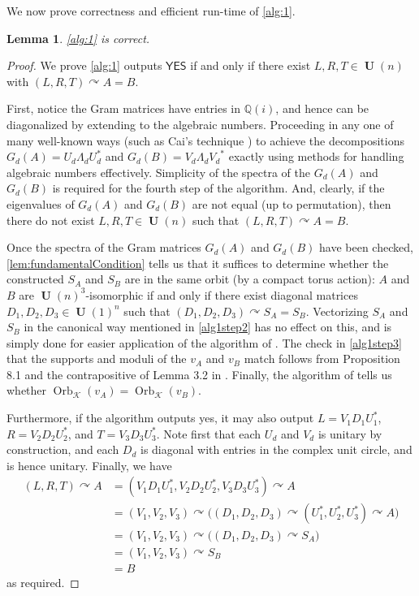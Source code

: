 \documentclass[11pt]{article}
\numberwithin{equation}{section}
\newtheorem{lemma}[theorem]{Lemma}
\theoremstyle{remark}
\DeclareMathOperator{\Orb}{Orb}
\DeclareMathOperator{\Unitary}{\textbf{U}}
\newcommand{\QQ}{\mathbb{Q}}
\newcommand{\cK}{\mathcal{K}}
\begin{document}
We now prove correctness and efficient run-time of \cref{alg:1}.

\begin{lemma}\label{lem:algoCorrect}
    \cref{alg:1} is correct.
\end{lemma}
\begin{proof}
We prove \cref{alg:1} outputs $\textsf{YES}$ if and only if there exist $L, R, T \in \Unitary(n)$ with $(L, R, T) \curvearrowright A = B$.

First, notice the Gram matrices have entries in $\QQ(i)$, and hence can be diagonalized by extending to the algebraic numbers. Proceeding in any one of many well-known ways (such as Cai's technique \cite{cai1994computing}) to achieve the decompositions $G_d(A) = U_d \Lambda_d U_d^*$ and $G_d(B)=V_d\Lambda_d {V_d}^*$ exactly using methods for handling algebraic numbers effectively.
Simplicity of the spectra of the $G_d(A)$ and $G_d(B)$ is required for the fourth step of the algorithm. And, clearly, if the eigenvalues of $G_d(A)$ and $G_d(B)$ are not equal (up to permutation), then there do not exist $L, R, T \in \Unitary(n)$ such that $(L, R, T) \curvearrowright A = B$.

Once the spectra of the Gram matrices $G_d(A)$ and $G_d(B)$ have been checked, \cref{lem:fundamentalCondition} tells us that it suffices to determine whether the constructed $S_A$ and $S_B$ are in the same orbit (by a compact torus action): $A$ and $B$ are $\Unitary(n)^3$-isomorphic if and only if there exist diagonal matrices $D_1,D_2,D_3 \in \Unitary(1)^n$ such that $(D_1,D_2,D_3)\curvearrowright S_A = S_B$. Vectorizing $S_A$ and $S_B$ in the canonical way mentioned in \ref{alg1step2} has no effect on this, and is simply done for easier application of the algorithm of \cite{burgisser_et_alCCC.2021.32}.
The check in \ref{alg1step3} that the supports and moduli of the $v_A$ and $v_B$ match follows from Proposition 8.1 and the contrapositive of Lemma 3.2 in \cite{burgisser_et_alCCC.2021.32}.
Finally, the algorithm of \cite{burgisser_et_alCCC.2021.32} tells us whether $\Orb_\cK(v_A) = \Orb_\cK(v_B)$.

Furthermore, if the algorithm outputs yes, it may also output $L= V_1D_1U_1^*$, $R = V_2D_2U_2^*$, and $T = V_3D_3U_3^*$. Note first that each $U_d$ and $V_d$ is unitary by construction, and each $D_d$ is diagonal with entries in the complex unit circle, and is hence unitary. Finally, we have
\begin{align*}
(L,R,T)\curvearrowright A
&=(V_1D_1U_1^*,V_2D_2U_2^*,V_3D_3U_3^*) \curvearrowright A\\
&=(V_1,V_2,V_3)\curvearrowright \big((D_1,D_2,D_3)\curvearrowright (U_1^*,U_2^*,U_3^*)\curvearrowright A\big)\\
&=(V_1,V_2,V_3)\curvearrowright \big((D_1,D_2,D_3)\curvearrowright S_A\big)\\
&=(V_1,V_2,V_3)\curvearrowright S_B\\
&=B
\end{align*}
as required.
\end{proof}
\end{document}
